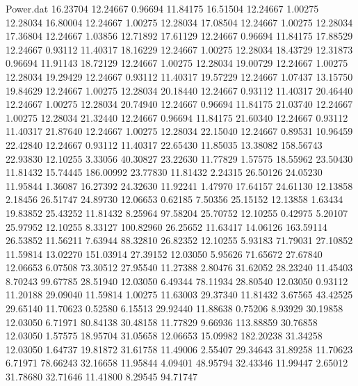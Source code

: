 \begin{filecontents}{Power.dat}
  16.23704   12.24667    0.96694   11.84175
  16.51504   12.24667    1.00275   12.28034
  16.80004   12.24667    1.00275   12.28034
  17.08504   12.24667    1.00275   12.28034
  17.36804   12.24667    1.03856   12.71892
  17.61129   12.24667    0.96694   11.84175
  17.88529   12.24667    0.93112   11.40317
  18.16229   12.24667    1.00275   12.28034
  18.43729   12.31873    0.96694   11.91143
  18.72129   12.24667    1.00275   12.28034
  19.00729   12.24667    1.00275   12.28034
  19.29429   12.24667    0.93112   11.40317
  19.57229   12.24667    1.07437   13.15750
  19.84629   12.24667    1.00275   12.28034
  20.18440   12.24667    0.93112   11.40317
  20.46440   12.24667    1.00275   12.28034
  20.74940   12.24667    0.96694   11.84175
  21.03740   12.24667    1.00275   12.28034
  21.32440   12.24667    0.96694   11.84175
  21.60340   12.24667    0.93112   11.40317
  21.87640   12.24667    1.00275   12.28034
  22.15040   12.24667    0.89531   10.96459
  22.42840   12.24667    0.93112   11.40317
  22.65430   11.85035   13.38082  158.56743
  22.93830   12.10255    3.33056   40.30827
  23.22630   11.77829    1.57575   18.55962
  23.50430   11.81432   15.74445  186.00992
  23.77830   11.81432    2.24315   26.50126
  24.05230   11.95844    1.36087   16.27392
  24.32630   11.92241    1.47970   17.64157
  24.61130   12.13858    2.18456   26.51747
  24.89730   12.06653    0.62185    7.50356
  25.15152   12.13858    1.63434   19.83852
  25.43252   11.81432    8.25964   97.58204
  25.70752   12.10255    0.42975    5.20107
  25.97952   12.10255    8.33127  100.82960
  26.25652   11.63417   14.06126  163.59114
  26.53852   11.56211    7.63944   88.32810
  26.82352   12.10255    5.93183   71.79031
  27.10852   11.59814   13.02270  151.03914
  27.39152   12.03050    5.95626   71.65672
  27.67840   12.06653    6.07508   73.30512
  27.95540   11.27388    2.80476   31.62052
  28.23240   11.45403    8.70243   99.67785
  28.51940   12.03050    6.49344   78.11934
  28.80540   12.03050    0.93112   11.20188
  29.09040   11.59814    1.00275   11.63003
  29.37340   11.81432    3.67565   43.42525
  29.65140   11.70623    0.52580    6.15513
  29.92440   11.88638    0.75206    8.93929
  30.19858   12.03050    6.71971   80.84138
  30.48158   11.77829    9.66936  113.88859
  30.76858   12.03050    1.57575   18.95704
  31.05658   12.06653   15.09982  182.20238
  31.34258   12.03050    1.64737   19.81872
  31.61758   11.49006    2.55407   29.34643
  31.89258   11.70623    6.71971   78.66243
  32.16658   11.95844    4.09401   48.95794
  32.43346   11.99447    2.65012   31.78680
  32.71646   11.41800    8.29545   94.71747

\end{filecontents}
